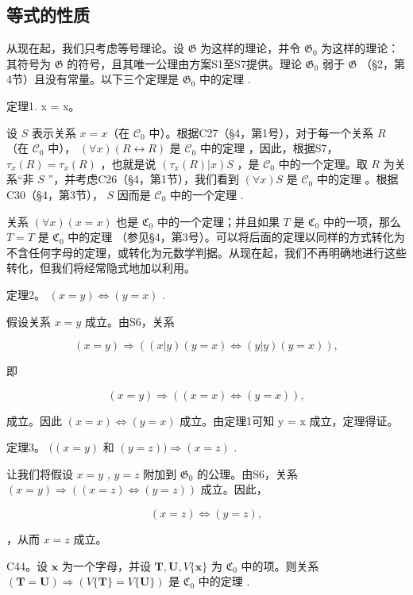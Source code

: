 \subsection{等式的性质}

从现在起，我们只考虑等号理论。设 \(\mathfrak{G}\) 为这样的理论，并令 \(\mathfrak{G}_0\) 为这样的理论：其符号为 \(\mathfrak{G}\) 的符号，且其唯一公理由方案S1至S7提供。理论 \(\mathfrak{G}_0\) 弱于 \(\mathfrak{G}\) （§2，第4节）且没有常量。以下三个定理是 \(\mathfrak{G}_0\) 中的定理 .

定理1. x = x。

设 \(S\) 表示关系 \(x = x\)（在 \(\mathcal{C}_0\) 中）。根据C27（§4，第1号），对于每一个关系 \(R\)（在 \(\mathcal{C}_0\) 中）， \((\forall x)(R \leftrightarrow R)\) 是 \(\mathcal{C}_0\) 中的定理 ，因此，根据S7， \(\tau_x(R) = \tau_x(R)\) ，也就是说 \((\tau_x(R)|x)S\) ，是 \(\mathcal{C}_0\) 中的一个定理。取 \(R\) 为关系“非 \(S\) ''，并考虑C26（§4，第1节），我们看到 \((\forall x)S\) 是 \(\mathcal{C}_0\) 中的定理 。根据C30（§4，第3节）， \(S\) 因而是 \(\mathcal{C}_0\) 中的一个定理 .

关系 \((\forall x)(x = x)\) 也是 \(\mathfrak{C}_0\) 中的一个定理；并且如果 \(T\) 是 \(\mathfrak{C}_0\) 中的一项，那么 \(T = T\) 是 \(\mathfrak{C}_0\) 中的定理 （参见§4，第3号）。可以将后面的定理以同样的方式转化为不含任何字母的定理，或转化为元数学判据。从现在起，我们不再明确地进行这些转化，但我们将经常隐式地加以利用。

定理2。 \((x = y) \Longleftrightarrow (y = x)\) .

假设关系 \(x = y\) 成立。由S6，关系

\[
(x = y) \Longrightarrow ((x | y) (y = x) \Longleftrightarrow (y | y) (y = x)),
\]

即

\[
(x = y) \Longrightarrow ((x = x) \Longleftrightarrow (y = x)),
\]

成立。因此 \((x = x) \Longleftrightarrow (y = x)\) 成立。由定理1可知 y = x 成立，定理得证。

定理3。 \(((x = y)\) 和 \((y = z))\Longrightarrow (x = z)\) .

让我们将假设 \(x = y\) , \(y = z\) 附加到 \(\mathfrak{G}_0\) 的公理。由S6，关系 \((x = y) \Longrightarrow ((x = z) \Longleftrightarrow (y = z))\) 成立。因此，

\[
(x = z) \Longleftrightarrow (y = z),
\]

，从而 \(x = z\) 成立。

C44。设 \(\pmb{x}\) 为一个字母，并设 \(\pmb{T}, \pmb{U}, V\{\pmb{x}\}\) 为 \(\mathfrak{C}_0\) 中的项。则关系 \((\pmb{T} = \pmb{U}) \Longrightarrow (V\{\pmb{T}\} = V\{\pmb{U}\})\) 是 \(\mathfrak{C}_0\) 中的定理 .

